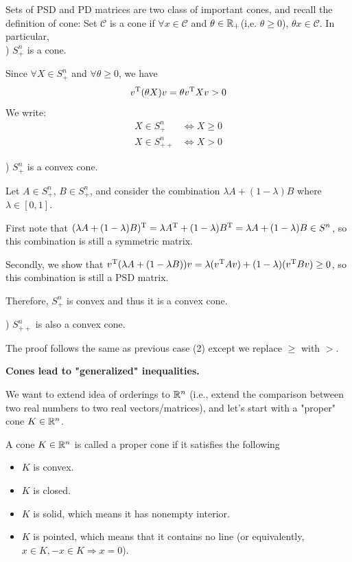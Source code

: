 Sets of PSD and PD matrices are two class of important cones, and recall the definition of cone: Set $\mathcal{C}$ is a cone if $\forall x\in \mathcal{C}$ and $\theta \in \mathbb{R}_{+}$(i,e. $\theta \geq 0$), $\theta x\in \mathcal{C}$. In particular,  \\ 

\vspace{0.2cm}
) $S_+^n$ is a cone.

Since $\forall X \in S_+^n$ and $\forall \theta \geq 0$, we have
$$v^{{\rm T}}(\theta X)v = \theta v^{{\rm T}}Xv  > 0$$
We write:
\begin{align*}
X\in S^n_+ &\Leftrightarrow X\geq 0\\
X\in S^n_{++} &\Leftrightarrow X> 0
\end{align*}

\vspace{0.2cm}
) $S_+^n$ is a convex cone.

Let $A\in S^n_+$, $B\in S^n_+$, and consider the combination $\lambda A + (1-\lambda)B$ where $\lambda \in [0,1]$.

First note that $(\lambda A + (1-\lambda)B)^{{\rm T}}= \lambda A^{{\rm T}} + (1-\lambda)B^{{\rm T}} = \lambda A + (1-\lambda)B \in S^n$, so this combination is still a symmetric matrix.

Secondly, we show that $v^{{\rm T}}(\lambda A + (1-\lambda B))v =\lambda(v^{{\rm T}}Av) + (1-\lambda)(v^{{\rm T}}Bv)\geq 0$, so this combination is still a PSD matrix. 

Therefore, $S_+^n$ is convex and thus it is a convex cone.

\vspace{0.2cm}
) $S^n_{++}$ is also a convex cone. 

The proof follows the same as previous case (2) except we replace $\geq$ with $>$.



\vspace{0.3cm}
\textbf{Cones lead to "generalized" inequalities.}

We want to extend idea of orderings to $\mathbb{R}^n$ (i.e., extend the comparison between two real numbers to two real vectors/matrices), and let's start with a "proper" cone $K\in \mathbb{R}^n$. 

\begin{definition}
A cone $K\in \mathbb{R}^n$ is called a proper cone if it satisfies the following
\begin{itemize}
	\item $K$ is convex.
	\item $K$ is closed. 
	\item $K$ is solid, which means it has nonempty interior.
	\item $K$ is pointed, which means that it contains no line (or equivalently, $x \in K, -x\in K \Rightarrow x=0$).
\end{itemize}
\end{definition}


